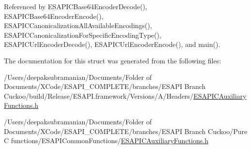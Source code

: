 Referenced by ESAPICBase64EncoderDecode(), ESAPICBase64EncoderEncode(), ESAPICCanonicalizationAllAvailableEncodings(), ESAPICCanonicalizationForSpecificEncodingType(), ESAPICUrlEncoderDecode(), ESAPICUrlEncoderEncode(), and main().



The documentation for this struct was generated from the following files:\begin{DoxyCompactItemize}
\item 
/Users/deepaksubramanian/Documents/Folder of Documents/XCode/ESAPI\_\-COMPLETE/branches/ESAPI Branch Cuckoo/build/Release/ESAPI.framework/Versions/A/Headers/\hyperlink{a00004}{ESAPICAuxiliaryFunctions.h}\item 
/Users/deepaksubramanian/Documents/Folder of Documents/XCode/ESAPI\_\-COMPLETE/branches/ESAPI Branch Cuckoo/Pure C functions/ESAPICommonFunctions/\hyperlink{a00005}{ESAPICAuxiliaryFunctions.h}\end{DoxyCompactItemize}

